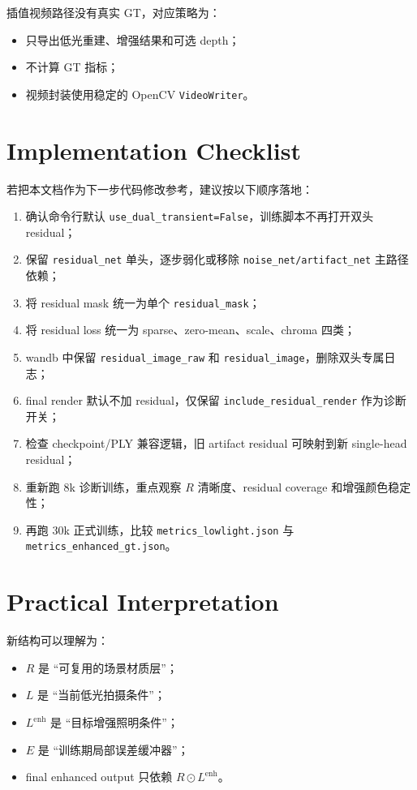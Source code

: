 \documentclass[11pt]{article}
\begin{document}
插值视频路径没有真实 GT，对应策略为：
\begin{itemize}[leftmargin=1.5em]
    \item 只导出低光重建、增强结果和可选 depth；
    \item 不计算 GT 指标；
    \item 视频封装使用稳定的 OpenCV \texttt{VideoWriter}。
\end{itemize}

\section{Implementation Checklist}

若把本文档作为下一步代码修改参考，建议按以下顺序落地：
\begin{enumerate}[leftmargin=1.8em]
    \item 确认命令行默认 \texttt{use\_dual\_transient=False}，训练脚本不再打开双头 residual；
    \item 保留 \texttt{residual\_net} 单头，逐步弱化或移除 \texttt{noise\_net/artifact\_net} 主路径依赖；
    \item 将 residual mask 统一为单个 \texttt{residual\_mask}；
    \item 将 residual loss 统一为 sparse、zero-mean、scale、chroma 四类；
    \item wandb 中保留 \texttt{residual\_image\_raw} 和 \texttt{residual\_image}，删除双头专属日志；
    \item final render 默认不加 residual，仅保留 \texttt{include\_residual\_render} 作为诊断开关；
    \item 检查 checkpoint/PLY 兼容逻辑，旧 artifact residual 可映射到新 single-head residual；
    \item 重新跑 8k 诊断训练，重点观察 $R$ 清晰度、residual coverage 和增强颜色稳定性；
    \item 再跑 30k 正式训练，比较 \texttt{metrics\_lowlight.json} 与 \texttt{metrics\_enhanced\_gt.json}。
\end{enumerate}

\section{Practical Interpretation}

新结构可以理解为：
\begin{itemize}[leftmargin=1.5em]
    \item $R$ 是 ``可复用的场景材质层''；
    \item $L$ 是 ``当前低光拍摄条件''；
    \item $L^{\text{enh}}$ 是 ``目标增强照明条件''；
    \item $E$ 是 ``训练期局部误差缓冲器''；
    \item final enhanced output 只依赖 $R \odot L^{\text{enh}}$。
\end{itemize}
\end{document}
